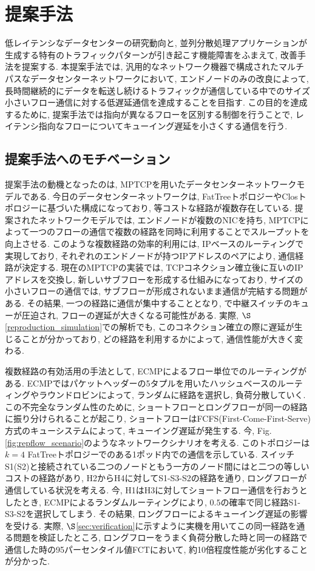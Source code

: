 \chapter{提案手法}
\label{chapter:proposal}
低レイテンシなデータセンターの研究動向と, 並列分散処理アプリケーションが生成する特有のトラフィックパターンが引き起こす機能障害をふまえて,
改善手法を提案する.
本提案手法では, 
汎用的なネットワーク機器で構成されたマルチパスなデータセンターネットワークにおいて, エンドノードのみの改良によって, 
長時間継続的にデータを転送し続けるトラフィックが通信している中でのサイズ小さいフロー通信に対する低遅延通信を達成することを目指す.
この目的を達成するために, 提案手法では指向が異なるフローを区別する制御を行うことで, レイテンシ指向なフローについてキューイング遅延を小さくする通信を行う.

\section{提案手法へのモチベーション}
提案手法の動機となったのは, MPTCPを用いたデータセンターネットワークモデルである\cite{improving}.
今日のデータセンターネットワークは, FatTreeトポロジーやClosトポロジーに基づいた構成になっており\cite{dctcp, vl2},
等コストな経路が複数存在している. 
提案されたネットワークモデルでは, エンドノードが複数のNICを持ち,
MPTCPによって一つのフローの通信で複数の経路を同時に利用することでスループットを向上させる.
このような複数経路の効率的利用には, IPベースのルーティングで実現しており, それぞれのエンドノードが持つIPアドレスのペアにより, 通信経路が決定する.
現在のMPTCPの実装では, TCPコネクション確立後に互いのIPアドレスを交換し,
新しいサブフローを形成する仕組みになっており, サイズの小さいフローの通信では, サブフローが形成されないまま通信が完結する問題がある. 
その結果, 一つの経路に通信が集中することとなり, で中継スイッチのキューが圧迫され, フローの遅延が大きくなる可能性がある. 
実際, $\S$\ref{reproduction_simulation}での解析でも,
このコネクション確立の際に遅延が生じることが分かっており\cite{mptcp_ana}, どの経路を利用するかによって, 通信性能が大きく変わる.

複数経路の有効活用の手法として, ECMPによるフロー単位でのルーティングがある. 
ECMPではパケットヘッダーの5タプルを用いたハッシュベースのルーティングやラウンドロビンによって, ランダムに経路を選択し, 負荷分散していく. 
この不完全なランダム性のために, ショートフローとロングフローが同一の経路に振り分けられることが起こり,
ショートフローはFCFS(First-Come-First-Serve)方式のキューシステムによって, キューイング遅延が発生する. 
今, Fig.\ref{fig:repflow_scenario}のようなネットワークシナリオを考える. 
このトポロジーは$k=4$ FatTreeトポロジーでのある1ポッド内での通信を示している. 
スイッチS1(S2)と接続されている二つのノードともう一方のノード間にはと二つの等しいコストの経路があり, H2からH4に対してS1-S3-S2の経路を通り,
ロングフローが通信している状況を考える. 
今, H1はH3に対してショートフロー通信を行おうとしたとき, ECMPによるランダムルーティングにより,
$0.5$の確率で同じ経路S1-S3-S2を選択してしまう. 
その結果, ロングフローによるキューイング遅延の影響を受ける. 
実際, $\S$\ref{sec:verification}に示すように実機を用いてこの同一経路を通る問題を検証したところ,
ロングフローをうまく負荷分散した時と同一の経路で通信した時の95パーセンタイル値FCTにおいて,
約10倍程度性能が劣化することが分かった\cite{mptcp_ana2}.

